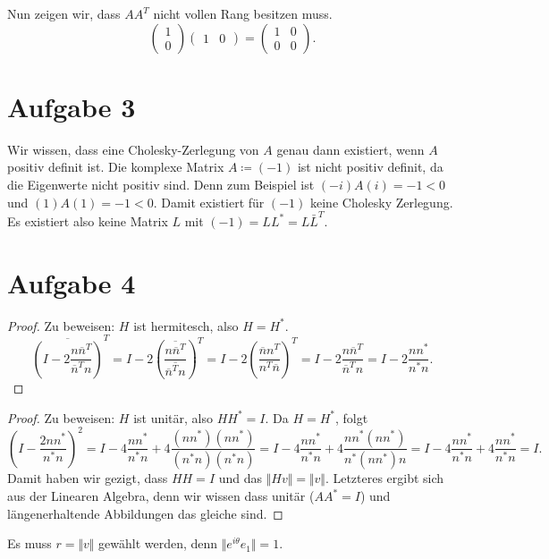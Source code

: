 \documentclass[9pt]{extarticle}
\theoremstyle{named}
\begin{document}
	Nun zeigen wir, dass $AA^T$ nicht vollen Rang besitzen muss. 
\[
\begin{pmatrix}
1 \\ 0
\end{pmatrix} \begin{pmatrix}
1 & 0
\end{pmatrix} = \begin{pmatrix}
1 & 0 \\ 0 & 0
\end{pmatrix}.
\]

\section*{Aufgabe 3}
Wir wissen, dass eine Cholesky-Zerlegung von $A$ genau dann existiert, wenn $A$ positiv definit ist. Die komplexe Matrix $A \coloneqq (-1)$ ist nicht positiv definit, da die Eigenwerte nicht positiv sind. Denn zum Beispiel ist $(-i)A(i) = -1 < 0$ und $(1)A(1) = -1 < 0$. Damit existiert für $(-1)$ keine Cholesky Zerlegung. Es existiert also keine Matrix $L$ mit $(-1) = LL^*= L \bar L^{T}$.

\section*{Aufgabe 4}
\begin{proof}
	Zu beweisen: $H$ ist hermitesch, also $H = H^*$.
	\[
		\overline{(I- 2 \frac{n \overline{n}^T}{\overline{n}^Tn})}^T = I - 2 \left(\frac{\overline{n\overline n^T}}{\overline{\overline n^T n}}\right)^T = I - 2 \left( \frac{\overline nn^T}{n^T \overline n} \right)^T = I-2 \frac{n \overline n^T}{\overline n^T n} = I -2 \frac{nn^*}{n^*n}.
	\]
\end{proof}
\begin{proof}
	Zu beweisen: $H$ ist unitär, also $HH^* = I$. Da $H = H^*$, folgt
	\[
		(I - \frac{2nn^*}{n^*n})^2 = I - 4\frac{nn^*}{n^*n} + 4\frac{(nn^*)(nn^*)}{(n^*n)(n^*n)} = I - 4\frac{nn^*}{n^*n} + 4\frac{nn^*(nn^*)}{n^*(nn^*)n} = I - 4\frac{nn^*}{n^*n} + 4\frac{nn^*}{n^*n} = I. 
	\]
	Damit haben wir gezigt, dass $HH = I$ und das $\Vert Hv \Vert= \Vert v \Vert$. Letzteres ergibt sich aus der Linearen Algebra, denn wir wissen dass unitär ($AA^* = I$) und längenerhaltende Abbildungen das gleiche sind.
\end{proof}

Es muss $r = \Vert v \Vert$ gewählt werden, denn $\Vert e^{i\theta}e_1 \Vert = 1$.
\end{document}
